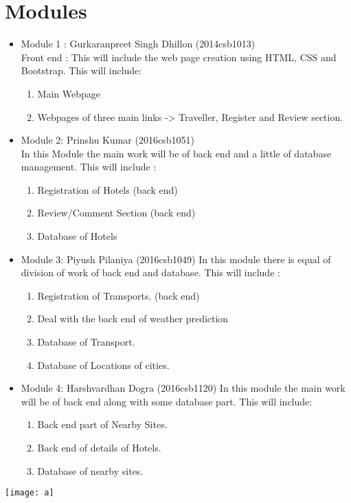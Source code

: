 \documentclass{article}
\begin{document}
\section{Modules}
\begin{itemize}
    \item Module 1 : Gurkaranpreet Singh Dhillon (2014csb1013)\\
    Front end : This will include the web page creation using HTML, CSS and Bootstrap.
    This will include:
    \begin{enumerate}
        \item Main Webpage
        \item Webpages of three main links -> Traveller, Register and Review section.\\
    \end{enumerate}
    
    \item Module 2: Prinshu Kumar (2016csb1051)\\
    In this Module the main work will be of back end and a little of database management.
    This will include :
    \begin{enumerate}
        \item Registration of Hotels (back end)
        \item Review/Comment Section (back end)
        \item Database of Hotels\\
    \end{enumerate}
    \item Module 3: Piyush Pilaniya (2016csb1049)
    In this module there is equal of division of work of back end and database. 
    This will include :
    \begin{enumerate}
        \item Registration of Transports. (back end)
        \item Deal with the back end of weather prediction
        \item Database of Transport.
        \item Database of Locations of cities.\\
    \end{enumerate}
    \item Module 4: Harshvardhan Dogra (2016csb1120)
    In this module the main work will be of back end along with some database part.
    This will include:
    \begin{enumerate}
        \item Back end part of Nearby Sites.
        \item Back end of details of Hotels.
        \item Database of nearby sites.
    \end{enumerate}
\end{itemize}

\texttt{[image: a]}
\end{document}

